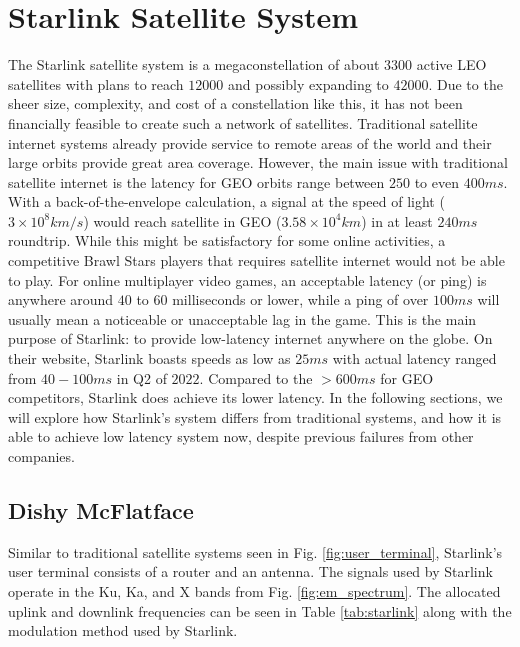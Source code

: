 \documentclass[10pt]{article}
\begin{document}
\section{Starlink Satellite System}
\label{starlink}

The Starlink satellite system is a megaconstellation of about $3300$ active LEO satellites with plans to reach $12000$ and possibly expanding to $42000$. Due to the sheer size, complexity, and cost of a constellation like this, it has not been financially feasible to create such a network of satellites. Traditional satellite internet systems already provide service to remote areas of the world and their large orbits provide great area coverage. However, the main issue with traditional satellite internet is the latency for GEO orbits range between $250$ to even $400\si{ms}$\cite{zhang1997satellite}. With a back-of-the-envelope calculation, a signal at the speed of light ($3\times 10^8\si{km/s}$) would reach satellite in GEO ($3.58 \times 10^4 \si{km}$) in at least $240\si{ms}$ roundtrip. While this might be satisfactory for some online activities, a competitive Brawl Stars players that requires satellite internet would not be able to play. For online multiplayer video games, an acceptable latency (or ping) is anywhere around $40$ to $60$ milliseconds or lower, while a ping of over $100\si{ms}$ will usually mean a noticeable or unacceptable lag in the game. This is the main purpose of Starlink: to provide low-latency internet anywhere on the globe. On their website, Starlink boasts speeds as low as $25\si{ms}$ with actual latency ranged from $40-100\si{ms}$ in Q2 of $2022$. Compared to the $>600\si{ms}$ for GEO competitors, Starlink does achieve its lower latency\cite{ookla}. In the following sections, we will explore how Starlink's system differs from traditional systems, and how it is able to achieve low latency system now, despite previous failures from other companies.

\subsection{Dishy McFlatface}
\label{dishy}

Similar to traditional satellite systems seen in Fig. \ref{fig:user_terminal}, Starlink's user terminal consists of a router and an antenna. The signals used by Starlink operate in the Ku, Ka, and X bands from Fig. \ref{fig:em_spectrum}. The allocated uplink and downlink frequencies can be seen in Table \ref{tab:starlink} along with the modulation method used by Starlink.
\end{document}
